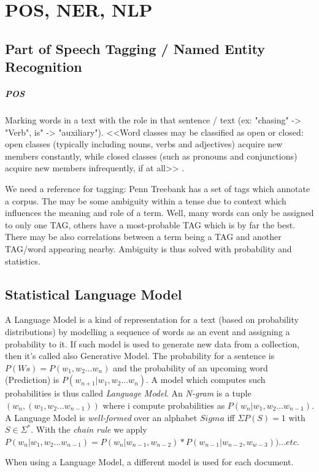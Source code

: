 \chapter{POS, NER, NLP}

\section{Part of Speech Tagging / Named Entity Recognition}

\paragraph{POS}

Marking words in a text with the role in that sentence / text (ex: "chasing" -> "Verb", is" -> "auxiliary").
<<Word classes may be classified as open or closed: open classes (typically including nouns, verbs and adjectives) acquire new members constantly, while closed classes (such as pronouns and conjunctions) acquire new members infrequently, if at all>> \cite{enwiki:1251632448}.

We need a reference for tagging: Penn Treebank has a set of tags which annotate a corpus.
The may be some ambiguity within a tense due to context which influences the meaning and role of a term.
Well, many words can only be assigned to only one TAG, others have a most-probable TAG which is by far the best.
There may be also correlations between a term being a TAG and another TAG/word appearing nearby.
Ambiguity is thus solved with probability and statistics.

\section{Statistical Language Model}

A Language Model is a kind of representation for a text (based on probability distributions) by modelling a sequence of words as an event and assigning a probability to it. If such model is used to generate new data from a collection, then it's called also Generative Model.
The probability for a sentence is $P(Ws) = P(w_1,w_2...w_n)$ and the probability of an upcoming word (Prediction) is $P(w_{n+1}|w_1,w_2...w_n)$. A model which computes such probabilities is thus called \emph{Language Model}.
An \emph{N-gram} is a tuple $(w_n, (w_1, w_2 ... w_{n-1}))$ where i compute probabilities as $P(w_n|w_1, w_2 ... w_{n-1})$.
A Language Model is \emph{well-formed} over an alphabet $Sigma$ iff $\Sigma P(S) = 1$ with $S \in \Sigma^{*}$.
With the \emph{chain rule} we apply $P(w_n|w_1, w_2 ... w_{n-1}) = P(w_n|w_{n-1}, w_{n-2}) * P(w_{n-1}|w_{n-2},w_{w-3})) ... etc$.

When using a Language Model, a different model is used for each document.
